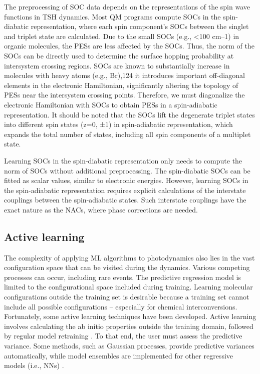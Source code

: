\documentclass[9pt,bestpractices]{livecoms}
\begin{document}
The preprocessing of SOC data depends on the representations of the spin wave functions in TSH dynamics. Most QM programs compute SOCs in the spin-diabatic representation, where each spin component's SOCs between the singlet and triplet state are calculated. Due to the small SOCs (e.g., <100 cm–1) in organic molecules, the PESs are less affected by the SOCs. Thus, the norm of the SOCs can be directly used to determine the surface hopping probability at intersystem crossing regions. SOCs are known to substantially increase in molecules with heavy atoms (e.g., Br),124 it introduces important off-diagonal elements in the electronic Hamiltonian, significantly altering the topology of PESs near the intersystem crossing points. Therefore, we must diagonalize the electronic Hamiltonian with SOCs to obtain PESs in a spin-adiabatic representation. It should be noted that the SOCs lift the degenerate triplet states into different spin states (z=0, ±1) in spin-adiabatic representation, which expands the total number of states, including all spin components of a multiplet state.

Learning SOCs in the spin-diabatic representation only needs to compute the norm of SOCs without additional preprocessing. The spin-diabatic SOCs can be fitted as scalar values, similar to electronic energies. However, learning SOCs in the spin-adiabatic representation requires explicit calculations of the interstate couplings between the spin-adiabatic states. Such interstate couplings have the exact nature as the NACs, where phase corrections are needed.

\subsection{Active learning}
\label{sec:activelearn}
The complexity of applying ML algorithms to photodynamics also lies in the vast configuration space that can be visited during the dynamics. Various competing processes can occur, including rare events. The predictive regression model is limited to the configurational space included during training. Learning molecular configurations outside the training set is desirable because a training set cannot include all possible configurations – especially for chemical interconversions. Fortunately, some active learning techniques have been developed. Active learning involves calculating the ab initio properties outside the training domain, followed by regular model retraining \cite{RN155}. To that end, the user must assess the predictive variance. Some methods, such as Gaussian processes, provide predictive variances automatically, while model ensembles are implemented for other regressive models (i.e., NNs) \cite{RN131, RN105}.
\end{document}

